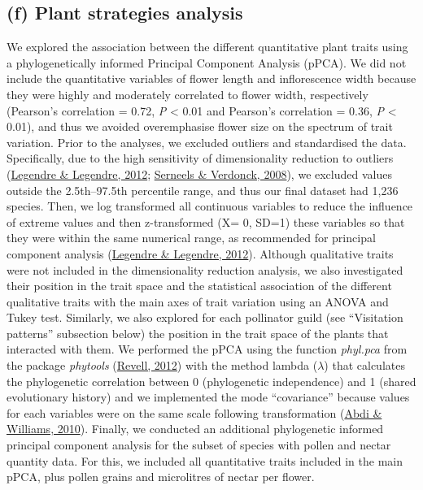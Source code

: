 \documentclass[
  12pt,
  a4paper,
]{article}
\begin{document}
\hypertarget{f-plant-strategies-analysis}{%
\subsection{(f) Plant strategies analysis}\label{f-plant-strategies-analysis}}

We explored the association between the different quantitative plant traits using a phylogenetically informed Principal Component Analysis (pPCA). We did not include the quantitative variables of flower length and inflorescence width because they were highly and moderately correlated to flower width, respectively (Pearson's correlation = 0.72, \emph{P} \textless{} 0.01 and Pearson's correlation = 0.36, \emph{P} \textless{} 0.01), and thus we avoided overemphasise flower size on the spectrum of trait variation. Prior to the analyses, we excluded outliers and standardised the data. Specifically, due to the high sensitivity of dimensionality reduction to outliers (\protect\hyperlink{ref-legendre2012}{Legendre \& Legendre, 2012}; \protect\hyperlink{ref-serneels2008}{Serneels \& Verdonck, 2008}), we excluded values outside the 2.5th--97.5th percentile range, and thus our final dataset had 1,236 species. Then, we log transformed all continuous variables to reduce the influence of extreme values and then z-transformed (X= 0, SD=1) these variables so that they were within the same numerical range, as recommended for principal component analysis (\protect\hyperlink{ref-legendre2012}{Legendre \& Legendre, 2012}). Although qualitative traits were not included in the dimensionality reduction analysis, we also investigated their position in the trait space and the statistical association of the different qualitative traits with the main axes of trait variation using an ANOVA and Tukey test. Similarly, we also explored for each pollinator guild (see ``Visitation patterns'' subsection below) the position in the trait space of the plants that interacted with them. We performed the pPCA using the function \emph{phyl.pca} from the package \emph{phytools} (\protect\hyperlink{ref-revell2012}{Revell, 2012}) with the method lambda (\(\lambda\)) that calculates the phylogenetic correlation between 0 (phylogenetic independence) and 1 (shared evolutionary history) and we implemented the mode ``covariance'' because values for each variables were on the same scale following transformation (\protect\hyperlink{ref-abdi2010}{Abdi \& Williams, 2010}). Finally, we conducted an additional phylogenetic informed principal component analysis for the subset of species with pollen and nectar quantity data. For this, we included all quantitative traits included in the main pPCA, plus pollen grains and microlitres of nectar per flower.
\end{document}
